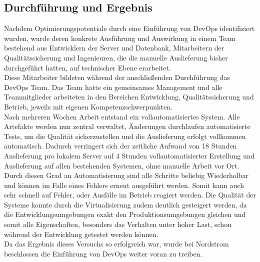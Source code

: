 \subsection{Durchführung und Ergebnis}
Nachdem Optimierungspotentiale durch eine Einführung von DevOps identifiziert wurden, wurde deren konkrete Ausführung und Auswirkung in einem Team bestehend aus Entwicklern der Server und Datenbank, Mitarbeitern der Qualitätssicherung und Ingenieuren, die die manuelle Auslieferung bisher durchgeführt hatten, auf technischer Ebene erarbeitet.\\
Diese Mitarbeiter bildeten während der anschließenden Durchführung das DevOps Team. Das Team hatte ein gemeinsames Management und alle Teammitglieder arbeiteten in den Bereichen Entwicklung, Qualitätssicherung und Betrieb, jeweils mit eigenen Kompetenzschwerpunkten. \parencite[Vgl.][S. 4]{Reed:2014}\\
Nach mehreren Wochen Arbeit entstand ein vollautomatisiertes System. Alle Artefakte werden nun zentral verwaltet, Änderungen durchlaufen automatisierte Tests, um die Qualität sicherzustellen und die Auslieferung erfolgt vollkommen automatisch. Dadurch verringert sich der zeitliche Aufwand von 18 Stunden Auslieferung pro lokalem Server auf 4 Stunden vollautomatisierter Erstellung und Auslieferung auf allen bestehenden Systemen, ohne manuelle Arbeit vor Ort. Durch diesen Grad an Automatisierung sind alle Schritte beliebig Wiederholbar und können im Falle eines Fehlers erneut ausgeführt werden. Somit kann auch sehr schnell auf Fehler, oder Ausfälle im Betrieb reagiert werden. Die Qualität der Systeme konnte durch die Virtualisierung zudem deutlich gesteigert werden, da die Entwicklungsumgebungen exakt den Produktionsumgebungen gleichen und somit alle Eigenschaften, besonders das Verhalten unter hoher Last, schon während der Entwicklung getestet werden können. \parencite[Vgl.][S. 6]{Reed:2014}\\
Da das Ergebnis dieses Versuchs so erfolgreich war, wurde bei Nordstrom beschlossen die Einführung von DevOps weiter voran zu treiben. \parencite[Vgl.][S. 14]{Reed:2014}
